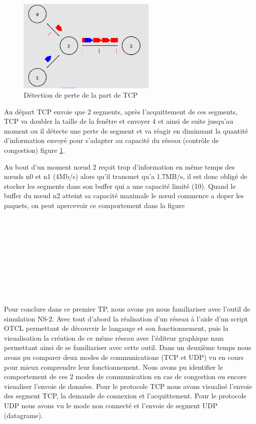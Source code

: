 \documentclass[11pt]{article}
\begin{document}
\begin{enumerate}
\begin{figure}[H]
	\begin{center}
		\includegraphics[width=0.6\textwidth]{assets/tp1/tcpDetectionPerte.png}
	\end{center}
	\caption{Détection de perte de la part de TCP}
	\label{detectPaquete}
\end{figure}
	
	
	
\end{enumerate}


Au départ TCP envoie que 2 segments, après l’acquittement de ces segments, TCP va doubler la taille de la fenêtre et envoyer 4 et ainsi de suite jusqu'au moment ou il détecte une perte de segment et va réagir en diminuant la quantité d'information envoyé pour s'adapter au capacité du réseau (contrôle de congestion) figure \ref{detectPaquete}. 

Au bout d'un moment nœud 2 reçoit trop d'information en même temps des nœuds n0 et n1 (4Mb/s) alors qu'il transmet qu'a 1.7MB/s, il est donc obligé de stocker les segments dans son buffer qui a une capacité limité (10). Quand le buffer du nœud n2 atteint sa capacité maximale le nœud commence a doper les paquets, on peut apercevoir ce comportement dans la figure 

~\\
\\
\\
\\
\\
\\
\\
\\
\\


Pour conclure dans ce premier TP, nous avons pu nous familiariser avec l’outil de simulation NS-2. Avec tout d’abord la réalisation d'un réseau à l’aide d’un script OTCL permettant de découvrir le langauge et son fonctionnement, puis la visualisation la création de ce même réseau avec l'éditeur graphique nam permettant ainsi de se familiariser avec cette outil. Dans un deuxième temps nous avons pu comparer deux modes de communications (TCP et UDP) vu en cours pour mieux comprendre leur fonctionnement. Nous avons pu identifier le comportement de ces 2 modes de communication en cas de congestion ou encore visualiser l'envoie de données. Pour le protocole TCP nous avons visualisé l'envoie des segment TCP, la demande de connexion et l'acquittement. Pour le protocole UDP nous avons vu le mode non connecté et l'envoie de segment UDP (datagrame).
\end{document}
